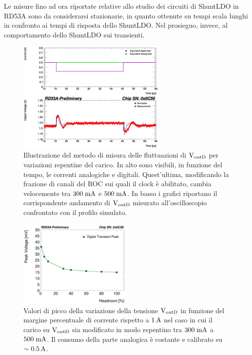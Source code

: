 
Le misure fino ad ora riportate relative allo studio dei circuiti di ShuntLDO in RD53A sono da considerarsi stazionarie, in quanto ottenute su tempi scala lunghi in confronto ai tempi di risposta dello ShuntLDO. Nel prosieguo, invece, al comportamento dello ShuntLDO sui transienti.
 
\begin{figure}
\centering
\includegraphics[width=0.65\textwidth]{Immagini/HeadRoom}
\caption{Illustrazione del metodo di misura delle fluttuazioni di $\mathrm{V_{outD}}$ per variazioni repentine del carico. In alto sono visibili, in funzione del tempo, le correnti analogiche e digitali. Quest'ultima, modificando la frazione di canali del ROC sui quali il clock \`e abilitato, cambia velocemente tra $300\rm \; mA$ e $500\rm \; mA$. In basso i grafici riportano il corrispondente andamento di $\mathrm{V_{outD}}$ misurato all'oscilloscopio confrontato con il profilo simulato.}
\label{LoadTransientScope}
\end{figure}
\begin{figure}[!b]
\centering
\includegraphics[width=0.50\textwidth]{Immagini/LoadTransientDominik}
\caption{Valori di picco della variazione della tensione $\mathrm{V_{outD}}$ in funzione del margine percentuale di corrente rispetto a $1\rm \, A$ nel caso in cui il carico su $\mathrm{V_{outD}}$ sia modificato in modo repentino tra $300\rm \; mA$ a $500\rm \; mA$. Il consumo della parte analogica \`e costante e calibrato su $\sim 0.5\rm \, A$. 
}
\label{LoadTransient}
\end{figure}
